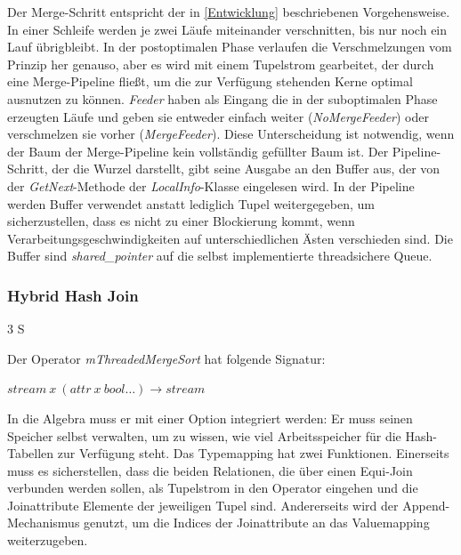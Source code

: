 \documentclass[a4paper,12pt,twoside]{article}
\newcommand{\Fb}[1]{\textit{#1}} %
\begin{document}
Der Merge-Schritt entspricht der in \autoref{Entwicklung} beschriebenen Vorgehensweise. In einer Schleife werden je zwei Läufe miteinander verschnitten, bis nur noch ein Lauf übrigbleibt. In der postoptimalen Phase verlaufen die Verschmelzungen vom Prinzip her genauso, aber es wird mit einem Tupelstrom gearbeitet, der durch eine Merge-Pipeline fließt, um die zur Verfügung stehenden Kerne optimal ausnutzen zu können. \Fb{Feeder} haben als Eingang die in der suboptimalen Phase erzeugten Läufe und geben sie entweder einfach weiter (\Fb{NoMergeFeeder}) oder verschmelzen sie vorher (\Fb{MergeFeeder}). Diese Unterscheidung ist notwendig, wenn der Baum der Merge-Pipeline kein vollständig gefüllter Baum ist. Der Pipeline-Schritt, der die Wurzel darstellt, gibt seine Ausgabe an den Buffer aus, der von der \Fb{GetNext}-Methode der \Fb{LocalInfo}-Klasse eingelesen wird. In der Pipeline werden Buffer verwendet anstatt lediglich Tupel weitergegeben, um sicherzustellen, dass es nicht zu einer Blockierung kommt, wenn Verarbeitungsgeschwindigkeiten auf unterschiedlichen Ästen verschieden sind. Die Buffer sind \Fb{shared\_pointer} auf die selbst implementierte threadsichere Queue.  


\subsubsection{Hybrid Hash Join} 3 S

Der Operator \Fb{mThreadedMergeSort} hat folgende Signatur:

$stream~x~(attr~x~bool \ldots) \longrightarrow stream$

In die Algebra muss er mit einer Option integriert werden: Er muss seinen Speicher selbst verwalten, um zu wissen, wie viel Arbeitsspeicher für die Hash-Tabellen zur Verfügung steht. Das Typemapping hat zwei Funktionen. Einerseits muss es sicherstellen, dass die beiden Relationen, die über einen Equi-Join verbunden werden sollen, als Tupelstrom in den Operator eingehen und die Joinattribute Elemente der jeweiligen Tupel sind. Andererseits wird der Append-Mechanismus genutzt, um die Indices der Joinattribute an das Valuemapping weiterzugeben.
\end{document}
